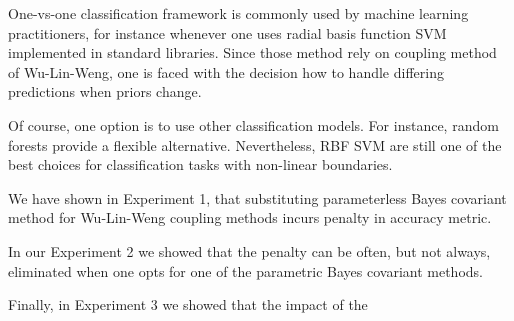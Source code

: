 One-vs-one classification framework is commonly used by machine learning practitioners, for instance whenever one uses radial basis function SVM implemented in  standard libraries. Since those method rely on coupling method of Wu-Lin-Weng, one is faced with the decision how to handle differing predictions when priors change.

Of course, one option is to use other classification models. For instance, random forests provide a flexible alternative. Nevertheless, RBF SVM are still one of the best choices for classification tasks with non-linear boundaries. 

We have shown in Experiment 1, that substituting parameterless Bayes covariant method for Wu-Lin-Weng coupling methods incurs penalty in accuracy metric. 

In our Experiment 2 we showed that the penalty can be often, but not always, eliminated when one opts for one of the parametric Bayes covariant methods.

Finally, in Experiment 3 we showed that the impact of the 
